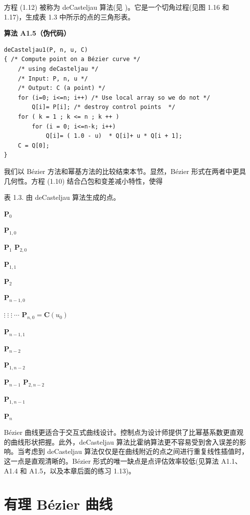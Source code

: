 \documentclass[../main.tex]{subfiles}
\begin{document}
方程 (1.12) 被称为 deCasteljau 算法(见 \cite{Boeh84,deCa86,deCa93})。它是一个切角过程(见图 1.16 和 1.17)，生成表 1.3 中所示的点的三角形表。

\par\medskip\noindent\textbf{算法 A1.5（伪代码）}\par
\begin{verbatim}
deCasteljau1(P, n, u, C)
{ /* Compute point on a Bézier curve */
    /* using deCasteljau */
    /* Input: P, n, u */
    /* Output: C (a point) */
    for (i=0; i<=n; i++) /* Use local array so we do not */
        Q[i]= P[i]; /* destroy control points  */
    for ( k = 1 ; k <= n ; k ++ )
        for (i = 0; i<=n-k; i++)
            Q[i]= ( 1.0 - u)  * Q[i]+ u * Q[i + 1];
    C = Q[0];
}
\end{verbatim}

我们以 Bézier 方法和幂基方法的比较结束本节。显然，Bézier 形式在两者中更具几何性。方程 (1.10) 结合凸包和变差减小特性，使得

表 1.3. 由 deCasteljau 算法生成的点。

\({\mathbf{P}}_{0}\)

\({\mathbf{P}}_{1,0}\)

\({\mathbf{P}}_{1}\)  \({\mathbf{P}}_{2,0}\)

\({\mathbf{P}}_{1,1}\)

\({\mathbf{P}}_{2}\)

\({\mathbf{P}}_{n - 1,0}\)

\(\vdots \;\vdots \;\vdots \;\cdots\)  \({\mathbf{P}}_{n,0} = \mathbf{C}\left( {u}_{0}\right)\)

\({\mathbf{P}}_{n - 1,1}\)

\({\mathbf{P}}_{n - 2}\)

\({\mathbf{P}}_{1,n - 2}\)

\({\mathbf{P}}_{n - 1}\)  \({\mathbf{P}}_{2,n - 2}\)

\({\mathbf{P}}_{1,n - 1}\)

\({\mathbf{P}}_{n}\)

Bézier 曲线更适合于交互式曲线设计。控制点为设计师提供了比幂基系数更直观的曲线形状把握。此外，deCasteljau 算法比霍纳算法更不容易受到舍入误差的影响。当考虑到 deCasteljau 算法仅仅是在曲线附近的点之间进行重复线性插值时，这一点是直观清晰的。Bézier 形式的唯一缺点是点评估效率较低(见算法 A1.1、A1.4 和 A1.5，以及本章后面的练习 1.13)。



\section{有理 Bézier 曲线}
\end{document}
